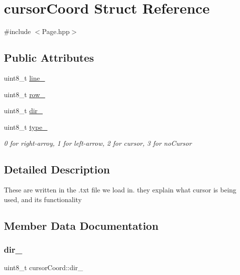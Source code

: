 \hypertarget{structcursor_coord}{}\section{cursor\+Coord Struct Reference}
\label{structcursor_coord}


{\ttfamily \#include $<$Page.\+hpp$>$}

\subsection*{Public Attributes}
\begin{DoxyCompactItemize}
\item 
uint8\+\_\+t \hyperlink{structcursor_coord_a96ae7079d4b13f2db265984e8bdfaea7}{line\+\_\+}
\item 
uint8\+\_\+t \hyperlink{structcursor_coord_adcbf204f25eb1f04a1cde76228262126}{row\+\_\+}
\item 
uint8\+\_\+t \hyperlink{structcursor_coord_a4bd165b265f2deddb7f9c4a146e8ff4e}{dir\+\_\+}
\item 
uint8\+\_\+t \hyperlink{structcursor_coord_a2da066bc6d678bf94b30106524cb11ef}{type\+\_\+}
\begin{DoxyCompactList}\small\item\em 0 for right-\/arroy, 1 for left-\/arrow, 2 for cursor, 3 for no\+Cursor \end{DoxyCompactList}\end{DoxyCompactItemize}


\subsection{Detailed Description}
These are written in the .txt file we load in. they explain what cursor is being used, and it\textquotesingle{}s functionality 

\subsection{Member Data Documentation}
\mbox{\label{structcursor_coord_a4bd165b265f2deddb7f9c4a146e8ff4e}} 
\subsubsection{\texorpdfstring{dir\+\_\+}{dir\_}}
{\footnotesize\ttfamily uint8\+\_\+t cursor\+Coord\+::dir\+\_\+}


